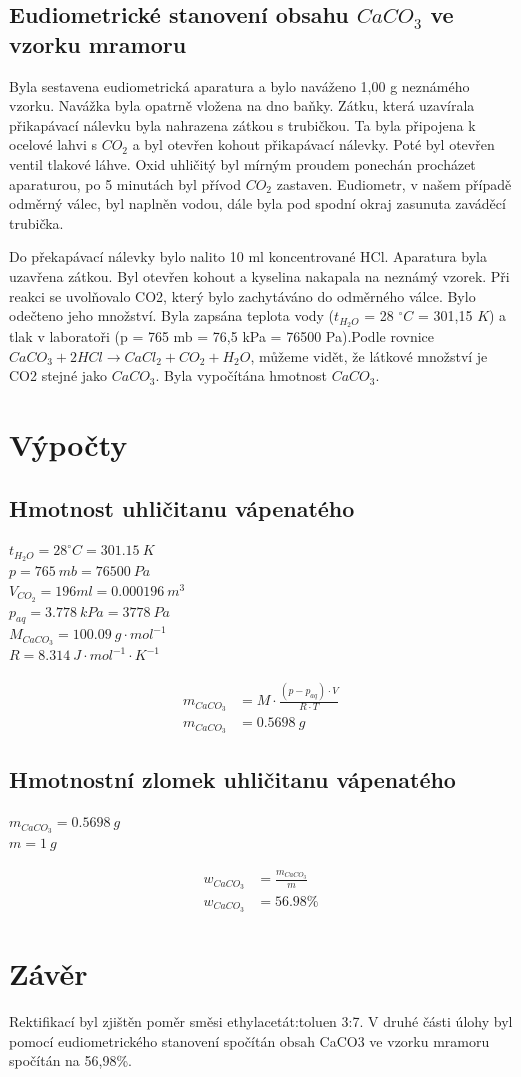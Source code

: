\documentclass[13pt, a4paper, twoside]{article}
\begin{document}
\subsection*{Eudiometrické stanovení obsahu $CaCO_3$ ve vzorku mramoru}
Byla sestavena eudiometrická aparatura  a bylo naváženo 1,00 g neznámého vzorku. Navážka byla opatrně vložena na dno baňky. Zátku, která uzavírala přikapávací nálevku byla nahrazena zátkou s trubičkou. Ta byla připojena k ocelové lahvi s $CO_2$ a byl otevřen kohout přikapávací nálevky. Poté byl otevřen ventil tlakové láhve. Oxid uhličitý byl mírným proudem ponechán procházet aparaturou, po 5 minutách byl přívod $CO_2$ zastaven. Eudiometr, v našem případě odměrný válec, byl naplněn vodou, dále byla pod spodní okraj zasunuta zaváděcí trubička.


Do překapávací nálevky bylo nalito 10 ml koncentrované HCl. Aparatura byla uzavřena zátkou. Byl otevřen kohout a kyselina nakapala na neznámý vzorek. Při reakci se uvolňovalo CO2, který bylo zachytáváno do odměrného válce. Bylo odečteno jeho množství. Byla zapsána teplota vody ($t_{H_2O}$ = 28 $^{\circ}C$ = 301,15 $K$) a tlak v laboratoři (p = 765 mb = 76,5 kPa = 76500 Pa).Podle rovnice $CaCO_3 + 2HCl \to CaCl_2 + CO_2 + H_2O$, můžeme vidět, že látkové množství je CO2 stejné jako $CaCO_3$. Byla vypočítána hmotnost $CaCO_3$.

\section*{Výpočty}
\subsection*{Hmotnost uhličitanu vápenatého}
$t_{H_2O}=28^{\circ}C = 301.15\: K$\\
$p = 765\: mb = 76500\:Pa$\\
$V_{CO_2}=196ml = 0.000196\:m^3$\\
$p_{aq}=3.778\:kPa=3778\:Pa$\\
$M_{CaCO_3} = 100.09 \: g\cdot mol^{-1}$\\
$R = 8.314\: J\cdot mol^{-1}\cdot K^{-1}$

\begin{align*}
    m_{CaCO_3} &= M\cdot\frac{(p-p_{aq})\cdot V}{R\cdot T}\\
    m_{CaCO_3} &= 0.5698 \: g
\end{align*}

\subsection*{Hmotnostní zlomek uhličitanu vápenatého}
$m_{CaCO_3}=0.5698\:g$\\
$m = 1\: g$

\begin{align*}
    w_{CaCO_3} &= \frac{m_{CaCO_3}}{m}\\
    w_{CaCO_3} &= 56.98\%
\end{align*}

\section*{Závěr}
Rektifikací byl zjištěn poměr směsi ethylacetát:toluen 3:7. V druhé části úlohy byl pomocí eudiometrického stanovení spočítán obsah CaCO3 ve vzorku mramoru spočítán na 56,98\%.
\end{document}
